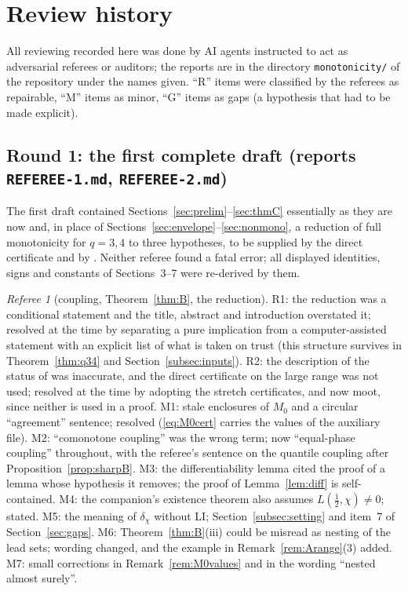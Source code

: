 \documentclass[11pt]{amsart}
\theoremstyle{definition}
\numberwithin{equation}{section}
\begin{document}
\appendix
\section{Review history}\label{sec:review}

All reviewing recorded here was done by AI agents instructed to act as
adversarial referees or auditors; the reports are in the directory
\texttt{monotonicity/} of the repository under the names given.
``R'' items were classified by the referees as repairable, ``M'' items
as minor, ``G'' items as gaps (a hypothesis that had to be made
explicit).

\subsection*{Round 1: the first complete draft (reports
\texttt{REFEREE-1.md}, \texttt{REFEREE-2.md})}
The first draft contained Sections~\ref{sec:prelim}--\ref{sec:thmC}
essentially as they are now and, in place of
Sections~\ref{sec:envelope}--\ref{sec:nonmono}, a reduction of full
monotonicity for $q=3,4$ to three hypotheses, to be supplied by the
direct certificate and by \cite{WR}. Neither referee found a fatal
error; all displayed identities, signs and constants of Sections~3--7
were re-derived by them.

\emph{Referee 1} (coupling, Theorem~\ref{thm:B}, the reduction).
R1: the reduction was a conditional statement and the title, abstract
and introduction overstated it; resolved at the time by separating a
pure implication from a computer-assisted statement with an explicit
list of what is taken on trust (this structure survives in
Theorem~\ref{thm:q34} and Section~\ref{subsec:inputs}). R2: the
description of the status of \cite[Corollary~7]{WR} was inaccurate,
and the direct certificate on the large range was not used; resolved
at the time by adopting the stretch certificates, and now moot, since
neither is used in a proof. M1: stale enclosures of $M_0$ and a
circular ``agreement'' sentence; resolved (\eqref{eq:M0cert} carries
the values of the auxiliary file). M2: ``comonotone coupling'' was the
wrong term; now ``equal-phase coupling'' throughout, with the
referee's sentence on the quantile coupling after
Proposition~\ref{prop:sharpB}. M3: the differentiability lemma cited
the proof of a lemma whose hypothesis it removes; the proof of
Lemma~\ref{lem:diff} is self-contained. M4: the companion's existence
theorem also assumes $L(\tfrac12,\chi)\ne0$; stated. M5: the meaning
of $\delta_\chi$ without LI; Section~\ref{subsec:setting} and item~7
of Section~\ref{sec:gaps}. M6: Theorem~\ref{thm:B}(iii) could be
misread as nesting of the lead sets; wording changed, and the example
in Remark~\ref{rem:Arange}(3) added. M7: small corrections in
Remark~\ref{rem:M0values} and in the wording ``nested almost
surely''.
\end{document}
